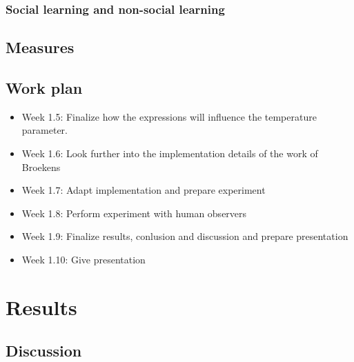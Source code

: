 \documentclass[conference]{IEEEtran}
\begin{document}
\subsubsection{Social learning and non-social learning}

\subsection{Measures}


\subsection{Work plan}
\begin{itemize}
    \item Week 1.5: Finalize how the expressions will influence the temperature parameter.
    \item Week 1.6: Look further into the implementation details of the work of Broekens \cite{Joost}
    \item Week 1.7: Adapt implementation and prepare experiment
    \item Week 1.8: Perform experiment with human observers
    \item Week 1.9: Finalize results, conlusion and discussion and prepare presentation
    \item Week 1.10: Give presentation
\end{itemize}
\section{Results}
\subsection{Discussion}
\end{document}
